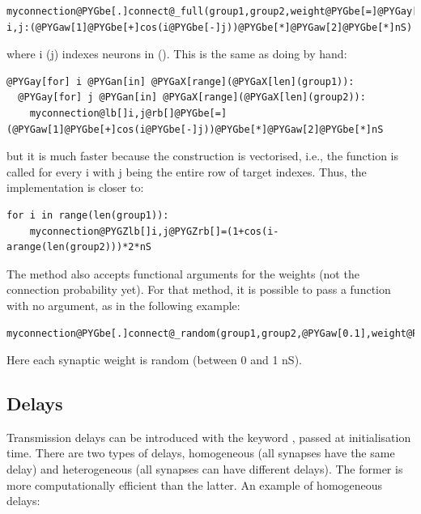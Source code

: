 \documentclass[letterpaper,10pt,english]{manual}
\begin{document}
\begin{Verbatim}[commandchars=@\[\]]
myconnection@PYGbe[.]connect@_full(group1,group2,weight@PYGbe[=]@PYGay[lambda] i,j:(@PYGaw[1]@PYGbe[+]cos(i@PYGbe[-]j))@PYGbe[*]@PYGaw[2]@PYGbe[*]nS)
\end{Verbatim}

where i (j) indexes neurons in  (). This is the same as doing by hand:

\begin{Verbatim}[commandchars=@\[\]]
@PYGay[for] i @PYGan[in] @PYGaX[range](@PYGaX[len](group1)):
  @PYGay[for] j @PYGan[in] @PYGaX[range](@PYGaX[len](group2)):
    myconnection@lb[]i,j@rb[]@PYGbe[=](@PYGaw[1]@PYGbe[+]cos(i@PYGbe[-]j))@PYGbe[*]@PYGaw[2]@PYGbe[*]nS
\end{Verbatim}

but it is much faster because the construction is vectorised, i.e., the function is called for every i
with j being the entire row of target indexes. Thus, the implementation is closer to:

\begin{Verbatim}[commandchars=@\[\]]
for i in range(len(group1)):
    myconnection@PYGZlb[]i,j@PYGZrb[]=(1+cos(i-arange(len(group2)))*2*nS
\end{Verbatim}

The method  also accepts functional arguments for the
weights (not the connection probability yet). For that method, it is possible to pass a function
with no argument, as in the following example:

\begin{Verbatim}[commandchars=@\[\]]
myconnection@PYGbe[.]connect@_random(group1,group2,@PYGaw[0.1],weight@PYGbe[=]@PYGay[lambda]:rand()@PYGbe[*]nS)
\end{Verbatim}

Here each synaptic weight is random (between 0 and 1 nS).


\subsection{Delays}

Transmission delays can be introduced with the keyword , passed at initialisation time.
There are two types of delays, homogeneous (all synapses have the same delay) and heterogeneous
(all synapses can have different delays). The former is more computationally efficient than the
latter. An example of homogeneous delays:
\end{document}
